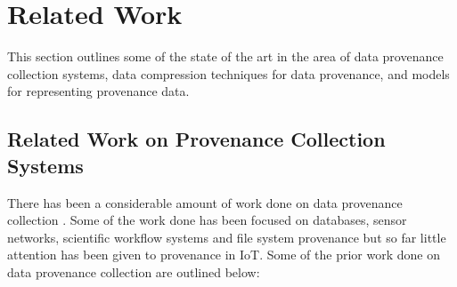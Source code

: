 


\chapter{Related Work}\label{background}

This section outlines some of the state of the art in the area of data provenance collection systems, data compression techniques for data provenance, and models for representing provenance data.


\section{Related Work on Provenance Collection Systems}

There has been a considerable amount of work done on data provenance collection \cite{_general-purpose_2012, bates_trustworthy_2015, gessiou_towards_2012, muniswamy_reddy_provenance_2010}. Some of the work done has been focused on databases, sensor networks, scientific workflow systems and file system provenance but so far little attention has been given to provenance in IoT. Some of the prior work done on data provenance collection are outlined below:

